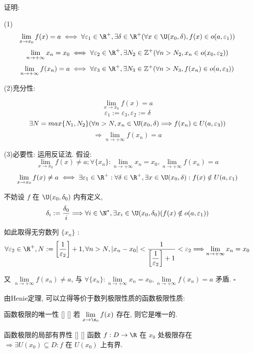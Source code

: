 \documentclass[UTF8]{ctexart}
\begin{document}
                \begin{prf}
			证明: 
			
				(1)\[\lim_{x\to x_0}f(x)=a\iff \forall\varepsilon_1\in\R^+, \exists\delta\in\R^+(\forall x\in\U(x_0,\delta), f(x)\in o(a,\varepsilon_1))\]
				\[\lim_{n\to+\infty} x_n=x_0\iff\forall\varepsilon_2\in\R^+,\exists N_2\in\mathbb{Z}^+(\forall n>N_2, x_n\in o(x_0,\varepsilon_2))\]
				\[\lim_{n\to+\infty} f(x_n)=a\iff\forall\varepsilon_3\in\R^+,\exists N_3\in\mathbb{Z}^+(\forall n>N_3, f(x_n)\in o(a,\varepsilon_3))\]
				
				(2)充分性: 
				
				\[\lim_{x\to x_0}f(x)=a\]
				\[\varepsilon_1:=\varepsilon_3, \varepsilon_2:=\delta\]
				\[\exists N=max\{N_1,N_2\}(\forall n>N, x_n\in\U(x_0,\delta)\Longrightarrow f(x_n)\in U(a,\varepsilon_3))\]
				\[\Longrightarrow\lim_{n\to+\infty}f(x_n)=a\]
				
				(3)必要性: 运用反证法. 假设: 
				\[\lim_{x\to x_0}f(x)\neq a; \forall\{x_n\}: \lim_{n\to+\infty} x_n=x_0,\lim_{n\to+\infty} f(x_n)=a\]
				\[\lim_{x\to x_0}f(x)\neq a\iff\exists\varepsilon_1\in\R^+: \forall \delta\in\R^+, \exists x\in\U(x_0,\delta): f(x)\notin U(a,\varepsilon_1)\]
				
				不妨设 \(f\) 在 \(\U(x_0,\delta_0)\) 内有定义, 
				\[\delta_i:=\frac{\delta_0}{i}\Longrightarrow\forall i\in\N^*, \exists x_i\in \U(x_0,\delta_0)(f(x)\notin o(a,\varepsilon_1))\]
				
				如此取得无穷数列 \(\{x_n\}\) : 
				\[\forall\varepsilon_2\in\R^+, N:=\left[\frac{1}{\varepsilon_2}\right]+1, \forall n>N, |x_n-x_0|<\frac{1}{\left[\dfrac{1}{\varepsilon_2}\right]+1}<\varepsilon_2\Longrightarrow\lim_{n\to+\infty}x_n=x_0\]
				
				又 \(\lim\limits_{n\to+\infty}f(x_n)\neq a\), 与 \(\forall\{x_n\}: \lim\limits_{n\to+\infty} x_n=x_0,\lim\limits_{n\to+\infty} f(x_n)=a\) 矛盾. \(\square\)
				\end{prf}
                由Henie定理, 可以立得等价于数列极限性质的函数极限性质: 
    
			\begin{ppt}
			    []
			    {函数极限的唯一性}
			    []
			    []
				若 \(\lim\limits_{x\to\x_0}f(x)\) 存在, 则它是唯一的.
			\end{ppt}

			\begin{ppt}
			    []
			    {函数极限的局部有界性}
			    []
			    []
				函数 \(f:D\to\R\) 在 \(x_0\) 处极限存在 \(\Longrightarrow\exists U(x_0)\subseteq D: f\) 在 \(U(x_0)\) 上有界. 
				
			
			\end{ppt}
\end{document}
